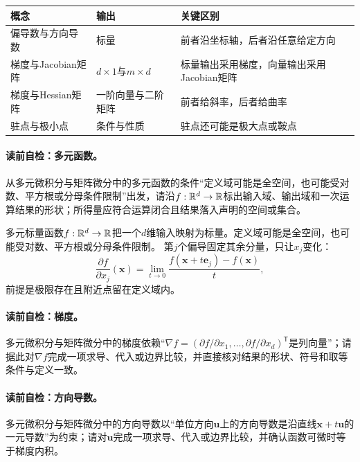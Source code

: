 \begin{comparisonbox}\label{schema:V1-C03:CH-31}
\begin{tabularx}{\linewidth}{@{}lXX@{}}
\toprule
概念 & 输出 & 关键区别\\
\midrule
偏导数与方向导数 & 标量 & 前者沿坐标轴，后者沿任意给定方向\\
梯度与Jacobian矩阵 & $d\times1$与$m\times d$ & 标量输出采用梯度，向量输出采用Jacobian矩阵\\
梯度与Hessian矩阵 & 一阶向量与二阶矩阵 & 前者给斜率，后者给曲率\\
驻点与极小点 & 条件与性质 & 驻点还可能是极大点或鞍点\\
\bottomrule
\end{tabularx}
\end{comparisonbox}

\paragraph{读前自检：多元函数。}从多元微积分与矩阵微分中的多元函数的条件“定义域可能是全空间，也可能受对数、平方根或分母条件限制”出发，请沿$f:\mathbb{R}^d\to\mathbb{R}$标出输入域、输出域和一次运算结果的形状；所得量应符合运算闭合且结果落入声明的空间或集合。\par

多元标量函数$f:\mathbb{R}^d\to\mathbb{R}$把一个$d$维输入映射为标量。定义域可能是全空间，也可能受对数、平方根或分母条件限制。
第$j$个偏导固定其余分量，只让$x_j$变化：
\[
\frac{\partial f}{\partial x_j}(\boldsymbol{x})=
\lim_{t\to0}\frac{f(\boldsymbol{x}+t\boldsymbol e_j)-f(\boldsymbol{x})}{t},
\]
前提是极限存在且附近点留在定义域内。


\paragraph{读前自检：梯度。}多元微积分与矩阵微分中的梯度依赖“$\nabla f=(\partial f/\partial x_1,\ldots,\partial f/\partial x_d)^{\mathsf T}$是列向量”；请据此对$\nabla f$完成一项求导、代入或边界比较，并直接核对结果的形状、符号和取等条件与定义一致。\par
\paragraph{读前自检：方向导数。}多元微积分与矩阵微分中的方向导数以“单位方向$\boldsymbol u$上的方向导数是沿直线$\boldsymbol{x}+t\boldsymbol u$的一元导数”为约束；请对$\boldsymbol u$完成一项求导、代入或边界比较，并确认函数可微时等于梯度内积。\par

